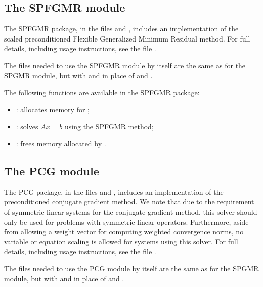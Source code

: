 \documentclass[letterpaper,10pt,english]{sphinxmanual}
\begin{document}
\subsection{The SPFGMR module}
\label{linear_solvers/SPILS:the-spfgmr-module}
The SPFGMR package, in the files  and
, includes an implementation of the scaled
preconditioned Flexible Generalized Minimum Residual method. For full
details, including usage instructions, see the file
.

The files needed to use the SPFGMR module by itself are the same as for
the SPGMR module, but with  and
 in place of  and
.

The following functions are available in the SPFGMR package:
\begin{itemize}
\item {} 
: allocates memory for ;

\item {} 
: solves $Ax = b$ using the SPFGMR method;

\item {} 
: frees memory allocated by .

\end{itemize}


\subsection{The PCG module}
\label{linear_solvers/SPILS:the-pcg-module}
The PCG package, in the files  and
, includes an implementation of the
preconditioned conjugate gradient method.  We note that due to the
requirement of symmetric linear systems for the conjugate gradient
method, this solver should only be used for problems with symmetric
linear operators.  Furthermore, aside from allowing a weight vector
for computing weighted convergence norms, no variable or equation
scaling is allowed for systems using this solver.  For full details,
including usage instructions, see the file .

The files needed to use the PCG module by itself are the same as for
the SPGMR module, but with  and
 in place of  and
.
\end{document}
